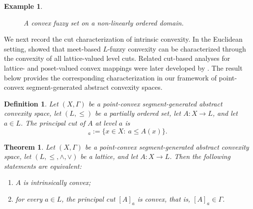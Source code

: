 \documentclass[11pt,a4paper]{article}
\newtheorem{theorem}{Theorem}
\newtheorem{example}{Example}
\newtheorem{definition}{Definition}
\begin{document}
\begin{example}
\begin{figure}[htbp]
\caption{A convex fuzzy set on a non-linearly ordered domain.}
\label{fig:non-chain-convexity}
\end{figure}
\end{example}

We next record the cut characterization of intrinsic convexity. In the Euclidean setting, \citet{Maruyama2009} showed that meet-based \(L\)-fuzzy convexity can be characterized through the convexity of all lattice-valued level cuts. Related cut-based analyses for lattice- and poset-valued convex mappings were later developed by \citet{JanisSeseljaTepavcevic2017}. The result below provides the corresponding characterization in our framework of point-convex segment-generated abstract convexity spaces.

\begin{definition}\label{defprincut}
Let \((X,\Gamma)\) be a point-convex segment-generated abstract convexity space, let \((L,\leq)\) be a partially ordered set, let \(A:X\to L\), and let \(a\in L\). The \emph{principal cut} of \(A\) at level \(a\) is
\begin{equation*}
[A]_a:=\{x\in X:\ a\le A(x)\}.
\end{equation*}
\end{definition}


\begin{theorem}\label{teo_princ_cuts}
Let \((X,\Gamma)\) be a point-convex segment-generated abstract convexity space, let \((L,\leq,\wedge,\vee)\) be a lattice, and let \(A:X\to L\). Then the following statements are equivalent:
\begin{enumerate}
    \item \(A\) is intrinsically convex;
    \item for every \(a\in L\), the principal cut \([A]_a\) is convex, that is, \([A]_a\in\Gamma\).
\end{enumerate}
\end{theorem}
\end{document}
